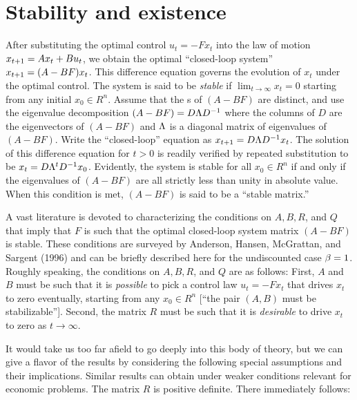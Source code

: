 \section{Stability and existence}\label{sec:ch4stable}%
After substituting the optimal control $u_t=-Fx_t$ into the
law of motion $x_{{t+1}}=Ax_t+Bu_t$, we obtain the optimal
``closed-loop system'' $x_{{t+1}}=(A-BF)x_t$.  This difference
equation governs the evolution of $x_t$ under the optimal
control.  The system is said to be {\it stable\/} if $\lim_{t\to\infty}
x_t=0$ starting from any initial $x_0\in R^n$.  Assume that the
s of $(A-BF)$ are distinct, and use the eigenvalue
decomposition $(A-BF)=D{\Lambda} D^{-1}$ where the columns of $D$
are the eigenvectors of $(A-BF)$ and ${\Lambda}$ is a diagonal
matrix of eigenvalues of $(A-BF)$.   Write the ``closed-loop'' equation
as $x_{{t+1}}=D{\Lambda} D^{-1} x_t$.  The solution of this difference
equation for $t>0$ is readily verified by repeated substitution
to be $x_t=D{\Lambda}^t D^{-1} x_0$.  Evidently, the system is stable
for all $x_0\in R^n$ if and only if the eigenvalues  of $(A-BF)$
are all strictly less than unity in
absolute value.  When this condition is met, $(A-BF)$ is said
to be a ``stable matrix.''

A vast
literature is devoted to characterizing the conditions on $A,B,R$, and $Q$
that imply that $F$ is such that the optimal closed-loop system matrix $(A-BF)$ is stable.  These
conditions are surveyed by Anderson, Hansen,
McGrattan, and Sargent (1996) and can be briefly described
here for the undiscounted case ${\beta}=1$.  Roughly speaking,
 the conditions on
$A,B,R$, and $Q$ are as follows:  First, $A$
and $B$ must be such that it is {\it possible\/} to pick a control law
$u_t=-Fx_t$ that drives $x_t$ to zero eventually, starting from any $x_0\in
R^n$ [``the pair $(A,B)$ must be stabilizable''].  Second, the matrix $R$ must
be such that it is {\it desirable\/} to drive $x_t$ to zero as
$t\to\infty$.

It would take us too far afield to go deeply into this body of
theory, but we can give a flavor of  the results by considering
the following special  assumptions and
their implications. Similar results can obtain under weaker conditions relevant for
economic problems.     
     The matrix $R$ is positive
definite.
\medskip
There immediately follows:


